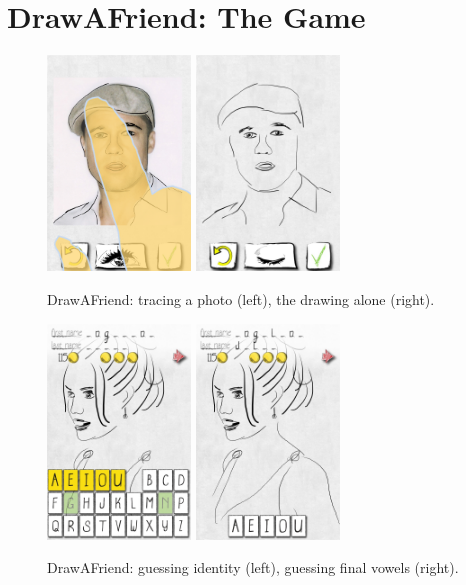 \section{DrawAFriend: The Game}

\begin{figure}
  \centering%
\includegraphics[width=1.5in]{DaF/PicHand2.png}
\hspace{0.1in}
\includegraphics[width=1.5in]{DaF/IMG_3044.jpg}
  \caption{DrawAFriend: tracing a photo (left), the drawing alone (right).}
  \label{fig:DaF}
\end{figure}

\begin{figure}
  \centering%
\includegraphics[width=1.5in]{DaF/IMG_3032.jpg}
\hspace{0.1in}
\includegraphics[width=1.5in]{DaF/IMG_3033.jpg}
  \caption{DrawAFriend: guessing identity (left), guessing final vowels (right).}
  \label{fig:DaF2}
\end{figure}

